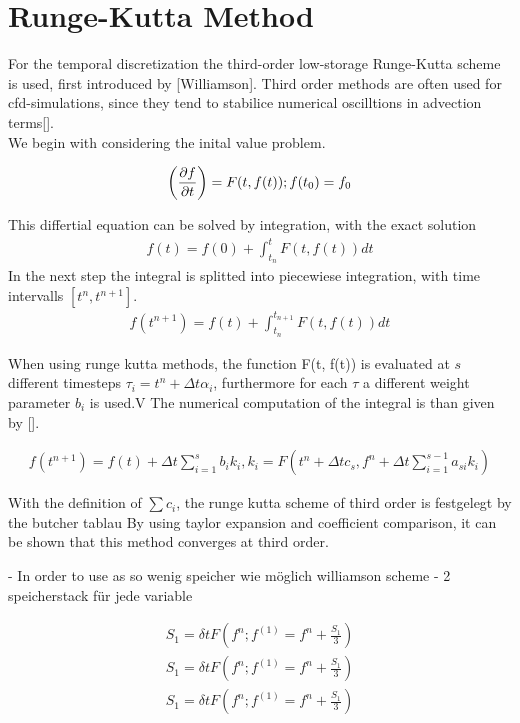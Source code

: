 \newpage

\section{Runge-Kutta Method}







For the temporal discretization the third-order low-storage Runge-Kutta scheme is used, first introduced by [Williamson].
Third order methods are often used for cfd-simulations, since they tend to stabilice numerical oscilltions in advection terms[].\\
We begin with considering the inital value problem.

\begin{align}
    \left(\pdn[f]{t}\right) = F(t, f(t)) ; f(t_0) = f_0
\end{align}

This differtial equation can be solved by integration, with the exact solution
\begin{align}
    f(t) = f(0) + \int_{t_n}^{t}F(t, f(t))dt
\end{align}
In the next step the integral is splitted into piecewiese integration, with time intervalls $[t^n, t^{n+1}]$.
\begin{align}
    f(t^{n+1}) = f(t) + \int_{t_n}^{t_{n+1}}F(t, f(t))dt
\end{align}

When using runge kutta methods, the function F(t, f(t)) is evaluated at $s$ different timesteps $\tau_i = t^n + \Delta t \alpha_i$,
furthermore for each $\tau$ a different weight parameter $b_i$ is used.V
The numerical computation of the integral is than given by [].

\begin{align}
    f(t^{n+1}) = f(t) + \Delta t \sum_{i=1}^s b_i k_i, k_i = F(t^n + \Delta t c_s, f^n + \Delta t \sum_{i=1}^{s-1}a_{si}k_i)
\end{align}

With the definition of $\sum c_i$, the runge kutta scheme of third order is festgelegt by the butcher tablau
By using taylor expansion and coefficient comparison, it can be shown that this  method converges at third order.


- In order to use as  so wenig speicher wie möglich williamson scheme
- 2 speicherstack für jede variable

\begin{align}
    S_1 = \delta t F(f^n ; f^(1) = f^n + \frac{S_1}{3}) \\
    S_1 = \delta t F(f^n ; f^(1) = f^n + \frac{S_1}{3}) \\
    S_1 = \delta t F(f^n ; f^(1) = f^n + \frac{S_1}{3}) \\
\end{align}


